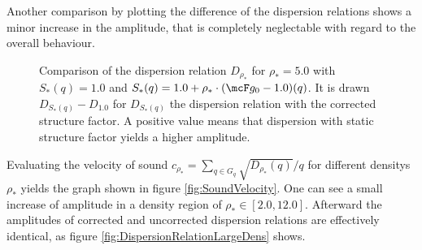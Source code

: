 Another comparison by plotting the difference of the dispersion relations shows a minor increase in the amplitude, that is completely neglectable with regard to the overall behaviour.
\begin{figure}[H]
    \centering
    \caption{Comparison of the dispersion relation $D_{\rho_*}$ for $\rho_* = 5.0$ with $S_*(q) = 1.0$ and $S_*(q) = 1.0 + \rho_*\cdot(\mcF g_0 - 1.0)(q)$. It is drawn $D_{S_*(q)} - D_{1.0}$ for $D_{S_*(q)}$ the dispersion relation with the corrected structure factor. A positive value means that dispersion with static structure factor yields a higher amplitude.}
    \label{fig:DispersionRelationComparison}
\end{figure}
Evaluating the velocity of sound $c_{\rho_*} = \sum_{q\in G_q}\sqrt{D_{\rho_*}(q)}/q$ for different densitys $\rho_*$ yields the graph shown in figure \ref{fig:SoundVelocity}. One can see a small increase of amplitude in a density region of $\rho_*\in[2.0,12.0]$. Afterward the amplitudes of corrected and uncorrected dispersion relations are effectively identical, as figure \ref{fig:DispersionRelationLargeDens} shows.
